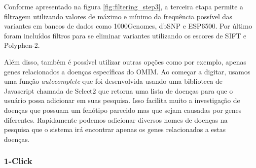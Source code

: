 
Conforme apresentado na figura \ref{fig:filtering_step3}, a terceira etapa permite a filtragem utilizando valores de máximo e mínimo da frequência possível das variantes em bancos de dados como 1000Genomes, dbSNP e ESP6500. Por último foram incluídos filtros para se eliminar variantes utilizando os escores de SIFT e Polyphen-2.

Além disso, também é possível utilizar outras opções como por exemplo, apenas genes relacionados a doenças específicas do OMIM. Ao começar a digitar, usamos uma função \textit{autocomplete} que foi desenvolvida usando uma biblioteca de Javascript chamada de Select2 que retorna uma lista de doenças para que o usuário possa adicionar em suas pesquisa. Isso facilita muito a investigação de doenças que possuam um fenótipo parecido mas que sejam causadas por genes diferentes. Rapidamente podemos adicionar diversos nomes de doenças na pesquisa que o sistema irá encontrar apenas os genes relacionados a estas doenças. 

\subsubsection{1-Click}


